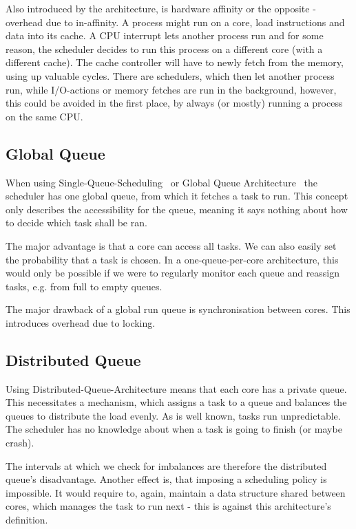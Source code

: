 \documentclass[runningheads]{llncs}
\begin{document}
Also introduced by the architecture, is hardware affinity or the opposite - overhead due to in-affinity. A process might run on a core, load instructions and data into its cache. A CPU interrupt lets another process run and for some reason, the scheduler decides to run this process on a different core (with a different cache). The cache controller will have to newly fetch from the memory, using up valuable cycles. There are schedulers, which then let another process run, while I/O-actions or memory fetches are run in the background, however, this could be avoided in the first place, by always (or mostly) running a process on the same CPU.~\cite{ostep}

\subsection{Global Queue}
When using Single-Queue-Scheduling~\cite{ostep} or Global Queue Architecture~\cite{meehean} the scheduler has one global queue, from which it fetches a task to run. This concept only describes the accessibility for the queue, meaning it says nothing about how to decide which task shall be ran.

The major advantage is that a core can access all tasks. We can also easily set the probability that a task is chosen. In a one-queue-per-core architecture, this would only be possible if we were to regularly monitor each queue and reassign tasks, e.g. from full to empty queues.

The major drawback of a global run queue is synchronisation between cores. This introduces overhead due to locking.~\cite{meehean}

\subsection{Distributed Queue}
Using Distributed-Queue-Architecture means that each core has a private queue. This necessitates a mechanism, which assigns a task to a queue and balances the queues to distribute the load evenly. As is well known, tasks run unpredictable. The scheduler has no knowledge about when a task is going to finish (or maybe crash). 

The intervals at which we check for imbalances are therefore the distributed queue's disadvantage. Another effect is, that imposing a scheduling policy is impossible. It would require to, again, maintain a data structure shared between cores, which manages the task to run next - this is against this architecture's definition.
\end{document}
